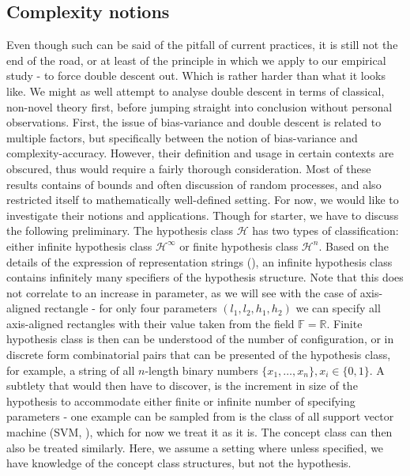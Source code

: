 \documentclass[10pt]{article}
\begin{document}
\subsection{Complexity notions}
Even though such can be said of the pitfall of current practices, it is still not the end of the road, or at least of the principle in which we apply to our empirical study - to force double descent out. Which is rather harder than what it looks like. We might as well attempt to analyse double descent in terms of classical, non-novel theory first, before jumping straight into conclusion without personal observations. First, the issue of bias-variance and double descent is related to multiple factors, but specifically between the notion of bias-variance and complexity-accuracy. However, their definition and usage in certain contexts are obscured, thus would require a fairly thorough consideration. Most of these results contains of bounds and often discussion of random processes, and also restricted itself to mathematically well-defined setting. For now, we would like to investigate their notions and applications. Though for starter, we have to discuss the following preliminary. The hypothesis class $\mathcal{H}$ has two types of classification: either infinite hypothesis class $\mathcal{H}^{\infty}$ or finite hypothesis class $\mathcal{H}^{n}$. Based on the details of the expression of representation strings (\cite{10.5555/200548}), an infinite hypothesis class contains infinitely many specifiers of the hypothesis structure. Note that this does not correlate to an increase in parameter, as we will see with the case of axis-aligned rectangle - for only four parameters $(l_{1},l_{2},h_{1},h_2)$ we can specify all axis-aligned rectangles with their value taken from the field $\mathbb{F}=\mathbb{R}$. Finite hypothesis class is then can be understood of the number of configuration, or in discrete form combinatorial pairs that can be presented of the hypothesis class, for example, a string of all $n$-length binary numbers $\{x_{1},\dots,x_{n}\}, x_{i}\in \{0,1\}$. A subtlety that would then have to discover, is the increment in size of the hypothesis to accommodate either finite or infinite number of specifying parameters - one example can be sampled from is the class of all support vector machine (SVM, \cite{Vapnik1999-VAPTNO}), which for now we treat it as it is. The concept class can then also be treated similarly. Here, we assume a setting where unless specified, we have knowledge of the concept class structures, but not the hypothesis. 
\end{document}
